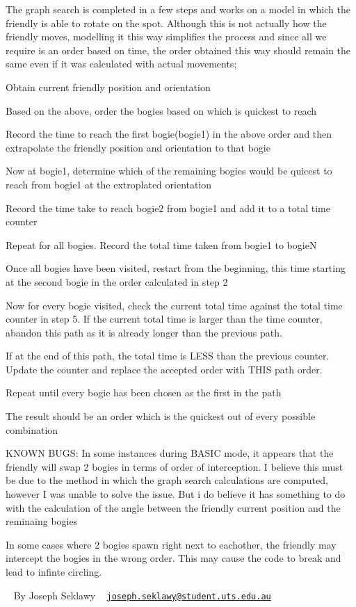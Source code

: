 The graph search is completed in a few steps and works on a model in which the friendly is able to rotate on the spot. Although this is not actually how the friendly moves, modelling it this way simplifies the process and since all we require is an order based on time, the order obtained this way should remain the same even if it was calculated with actual movements;
\begin{DoxyEnumerate}
\item Obtain current friendly position and orientation
\item Based on the above, order the bogie\textquotesingle{}s based on which is quickest to reach
\item Record the time to reach the first bogie(bogie1) in the above order and then extrapolate the friendly position and orientation to that bogie
\item Now at bogie1, determine which of the remaining bogies would be quicest to reach from bogie1 at the extroplated orientation
\item Record the time take to reach bogie2 from bogie1 and add it to a total time counter
\end{DoxyEnumerate}
\begin{DoxyEnumerate}
\item Repeat for all bogies. Record the total time taken from bogie1 to bogieN
\item Once all bogies have been visited, restart from the beginning, this time starting at the second bogie in the order calculated in step 2
\item Now for every bogie visited, check the current total time against the total time counter in step 5. If the current total time is larger than the time counter, abandon this path as it is already longer than the previous path.
\item If at the end of this path, the total time is L\+E\+SS than the previous counter. Update the counter and replace the accepted order with T\+H\+IS path order.
\item Repeat until every bogie has been chosen as the first in the path
\item The result should be an order which is the quickest out of every possible combination
\end{DoxyEnumerate}

K\+N\+O\+WN B\+U\+GS\+: In some instances during B\+A\+S\+IC mode, it appears that the friendly will swap 2 bogies in terms of order of interception. I believe this must be due to the method in which the graph search calculations are computed, however I was unable to solve the issue. But i do believe it has something to do with the calculation of the angle between the friendly current position and the reminaing bogies

In some cases where 2 bogies spawn right next to eachother, the friendly may intercept the bogies in the wrong order. This may cause the code to break and lead to infinte circling.

~\newline
 By Joseph Seklawy ~\newline
 \href{mailto:joseph.seklawy@student.uts.edu.au}{\tt joseph.\+seklawy@student.\+uts.\+edu.\+au} 